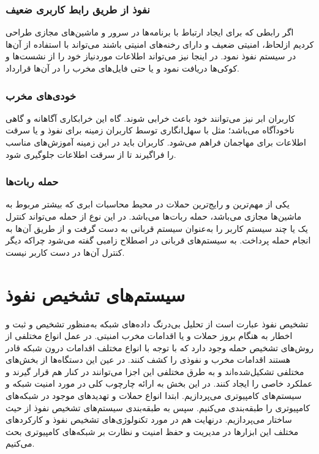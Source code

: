 \documentclass[a4paper,oneside,12pt]{report}
\begin{document}
\subsubsection{نفوذ از طریق رابط کاربری ضعیف}
 اگر رابطی که برای ایجاد ارتباط با برنامه‌ها در سرور و ماشین‌های مجازی طراحی کردیم ازلحاظ، امنیتی ضعیف و دارای رخنه‌های امنیتی باشند می‌تواند با استفاده از آن‌ها در سیستم نفوذ نمود. در اینجا نیز می‌تواند اطلاعات موردنیاز خود را از نشست‌ها و کوکی‌ها دریافت نمود و یا حتی فایل‌های مخرب را در آن‌ها قرارداد.
\subsubsection{خودی‌های مخرب}
کاربران ابر نیز می‌توانند خود باعث خرابی شوند. گاه این خرابکاری آگاهانه و گاهی ناخودآگاه می‌باشد؛ مثل با سهل‌انگاری توسط کاربران زمینه برای نفوذ و یا سرقت اطلاعات برای مهاجمان فراهم می‌شود. کاربران باید در این زمینه آموزش‌های مناسب را فراگیرند تا از سرقت اطلاعات جلوگیری شود.
\subsubsection{حمله ربات‌ها}
 یکی از مهم‌ترین و رایج‌ترین حملات در محیط محاسبات ابری که بیشتر مربوط به ماشین‌ها مجازی می‌باشد، حمله ربات‌ها می‌باشد. در این نوع از حمله می‌تواند کنترل یک یا چند سیستم کاربر را به‌عنوان سیستم قربانی به دست گرفت و از طریق آن‌ها به انجام حمله پرداخت. به سیستم‌های قربانی در اصطلاح زامبی گفته می‌شود چراکه دیگر کنترل آن‌ها در دست کاربر نیست.
 \section{سیستم‌های تشخیص نفوذ}
 تشخیص نفوذ عبارت است از تحلیل بی‌درنگ داده‌های شبکه به‌منظور تشخیص و ثبت و اخطار به هنگام بروز حملات و یا اقدامات مخرب امنیتی. در عمل انواع مختلفی از روش‌های تشخیص حمله وجود دارد که با توجه با انواع مختلف اقدامات درون شبکه قادر هستند اقدامات مخرب و نفوذی را کشف کنند. در عین این دستگاه‌ها از بخش‌های مختلفی تشکیل‌شده‌اند و به طرق مختلفی این اجزا می‌توانند در کنار هم قرار گیرند و عملکرد خاصی را ایجاد کنند. در این بخش به ارائه چارچوب کلی در مورد امنیت شبکه و سیستم‌های کامپیوتری می‌پردازیم. ابتدا انواع حملات و تهدیدهای موجود در شبکه‌های کامپیوتری را طبقه‌بندی می‌کنیم. سپس به طبقه‌بندی سیستم‌های تشخیص نفوذ از حیث ساختار می‌پردازیم. درنهایت هم در مورد تکنولوژی‌های تشخیص نفوذ و کارکردهای مختلف این ابزارها در مدیریت و حفظ امنیت و نظارت بر شبکه‌های کامپیوتری بحث می‌کنیم.
\end{document}
